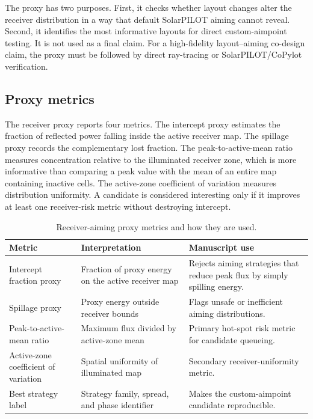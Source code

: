 \documentclass[final,3p,times]{elsarticle}
\begin{document}
The proxy has two purposes. First, it checks whether layout changes alter the receiver distribution in a way that default SolarPILOT aiming cannot reveal. Second, it identifies the most informative layouts for direct custom-aimpoint testing. It is not used as a final claim. For a high-fidelity layout--aiming co-design claim, the proxy must be followed by direct ray-tracing or SolarPILOT/CoPylot verification.

\subsection{Proxy metrics}
The receiver proxy reports four metrics. The intercept proxy estimates the fraction of reflected power falling inside the active receiver map. The spillage proxy records the complementary lost fraction. The peak-to-active-mean ratio measures concentration relative to the illuminated receiver zone, which is more informative than comparing a peak value with the mean of an entire map containing inactive cells. The active-zone coefficient of variation measures distribution uniformity. A candidate is considered interesting only if it improves at least one receiver-risk metric without destroying intercept.

\begin{table}[t]
\centering
\caption{Receiver-aiming proxy metrics and how they are used.}
\label{tab:proxy-metrics}
\small
\begin{tabular}{p{}p{}p{}}
\toprule
Metric & Interpretation & Manuscript use \\
\midrule
Intercept fraction proxy & Fraction of proxy energy on the active receiver map & Rejects aiming strategies that reduce peak flux by simply spilling energy. \\
Spillage proxy & Proxy energy outside receiver bounds & Flags unsafe or inefficient aiming distributions. \\
Peak-to-active-mean ratio & Maximum flux divided by active-zone mean & Primary hot-spot risk metric for candidate queueing. \\
Active-zone coefficient of variation & Spatial uniformity of illuminated map & Secondary receiver-uniformity metric. \\
Best strategy label & Strategy family, spread, and phase identifier & Makes the custom-aimpoint candidate reproducible. \\
\bottomrule
\end{tabular}
\end{table}
\end{document}
